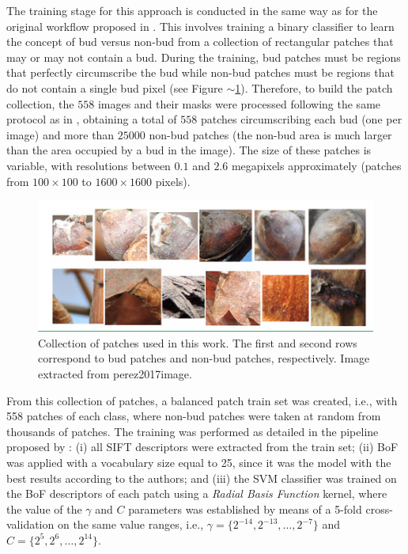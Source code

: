 \documentclass[a4paper,authoryear,review]{elsarticle}
\begin{document}
	The training stage for this approach is conducted in the same way as for the original workflow proposed in \citet{perez2017image}. This involves training a binary classifier to learn the concept of bud versus non-bud from a collection of rectangular patches that may or may not contain a bud. During the training, bud patches must be regions that perfectly circumscribe the bud while non-bud patches must be regions that do not contain a single bud pixel (see Figure $\sim$\ref{fig:Figure2}). Therefore, to build the patch collection, the $558$ images and their masks were processed following the same protocol as in \citet{perez2017image}, obtaining a total of  $558$ patches circumscribing each bud (one per image) and more than $25000$ non-bud patches (the non-bud area is much larger than the area occupied by a bud in the image). The size of these patches is variable, with resolutions between $0.1$ and $2.6$ megapixels approximately (patches from $100 \times 100$ to $1600 \times 1600$ pixels).
	
	
	\begin{figure}
		\centering
		\includegraphics[width=12cm]{figures/Figure2.png}
		\caption{
			Collection of patches used in this work. The first and second rows correspond to bud patches and non-bud patches, respectively. Image extracted from {perez2017image}.
		}
		\label{fig:Figure2}
	\end{figure}
	
	
	From this collection of patches, a balanced patch train set was created, i.e., with 558 patches of each class, where non-bud patches were taken at random from thousands of patches. The training was performed as detailed in the pipeline proposed by \citet{perez2017image}: (i) all SIFT descriptors were extracted from the train set; (ii) BoF was applied with a vocabulary size equal to 25, since it was the model with the best results according to the authors; and (iii) the SVM classifier was trained on the BoF descriptors of each patch using a \emph{Radial Basis Function} kernel, where the value of the $\gamma$ and $C$ parameters was established by means of a 5-fold cross-validation on the same value ranges, i.e., $\gamma = \{2^{-14}, 2^{-13}, \ldots, 2^{-7}\}$ and $C = \{2^{5}, 2^{6},\ldots , 2^{14}\}$.
	
\end{document}
